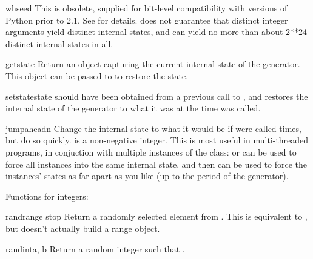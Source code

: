 \begin{funcdesc}{whseed}{}
  This is obsolete, supplied for bit-level compatibility with versions
  of Python prior to 2.1.
  See  for details.   does not guarantee
  that distinct integer arguments yield distinct internal states, and can
  yield no more than about 2**24 distinct internal states in all.
\end{funcdesc}

\begin{funcdesc}{getstate}{}
  Return an object capturing the current internal state of the
  generator.  This object can be passed to  to
  restore the state.
\end{funcdesc}

\begin{funcdesc}{setstate}{state}
   should have been obtained from a previous call to
  , and  restores the
  internal state of the generator to what it was at the time
   was called.
\end{funcdesc}

\begin{funcdesc}{jumpahead}{n}
  Change the internal state to what it would be if 
  were called  times, but do so quickly.   is a
  non-negative integer.  This is most useful in multi-threaded
  programs, in conjuction with multiple instances of the 
  class:  or  can be used to force
  all instances into the same internal state, and then
   can be used to force the instances' states as
  far apart as you like (up to the period of the generator).
 \end{funcdesc}

Functions for integers:

\begin{funcdesc}{randrange}{ stop}
  Return a randomly selected element from .  This is equivalent to
  ,
  but doesn't actually build a range object.
\end{funcdesc}

\begin{funcdesc}{randint}{a, b}
  Return a random integer  such that
  .
\end{funcdesc}


